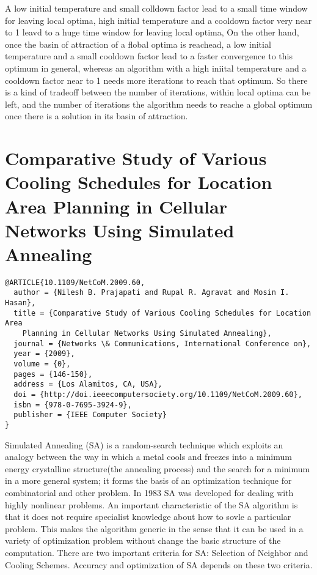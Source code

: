 \documentclass[pdftex,11pt]{article}
\begin{document}
A low initial temperature and small colldown factor lead to a small time window for leaving local optima, high initial temperature and a cooldown factor very near to 1 leavd to a huge time window for leaving local optima, On the other hand, once the basin of attraction of a flobal optima is reachead, a low initial temperature and a small cooldown factor lead to a faster convergence to this optimum in general, whereas an algorithm with a high iniital temperature and a cooldown factor near to 1 needs more iterations to reach that optimum. So there is a kind of tradeoff between the number of iterations, within local optima can be left, and the number of iterations the algorithm needs  to reache a global optimum once there is a solution in its basin of attraction.

\section*{Comparative Study of Various Cooling Schedules for Location Area Planning in Cellular Networks Using Simulated Annealing}
\begin{verbatim}
@ARTICLE{10.1109/NetCoM.2009.60,
  author = {Nilesh B. Prajapati and Rupal R. Agravat and Mosin I. Hasan},
  title = {Comparative Study of Various Cooling Schedules for Location Area
	Planning in Cellular Networks Using Simulated Annealing},
  journal = {Networks \& Communications, International Conference on},
  year = {2009},
  volume = {0},
  pages = {146-150},
  address = {Los Alamitos, CA, USA},
  doi = {http://doi.ieeecomputersociety.org/10.1109/NetCoM.2009.60},
  isbn = {978-0-7695-3924-9},
  publisher = {IEEE Computer Society}
}
\end{verbatim}
Simulated Annealing (SA) is a random-search technique which exploits an analogy between the way in which a metal cools and freezes into a minimum energy crystalline structure(the annealing process) and the search for a minimum in a more general system; it forms the basis of an optimization technique for combinatorial and other problem. In 1983 SA was developed for dealing with highly nonlinear problems. An important characteristic of the SA algorithm is that it does not require specialist knowledge about how to sovle a particular problem. This makes the algorithm generic in the sense that it can be used in a variety of optimization problem without change the basic structure of the computation. There are two important criteria for SA: Selection of Neighbor and Cooling Schemes. Accuracy and optimization of SA depends on these two criteria.
\end{document}
